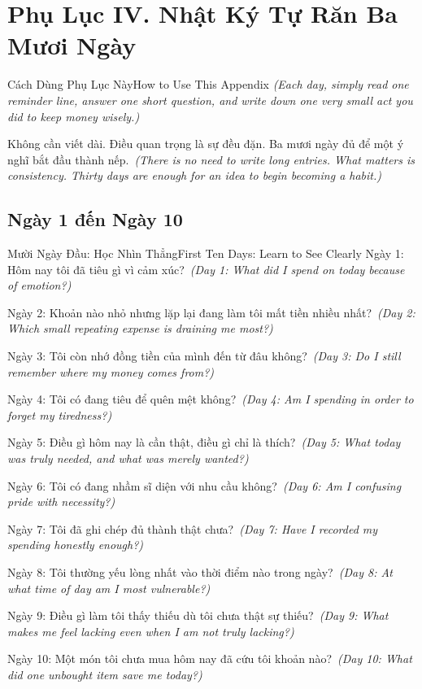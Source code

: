 \chapter*{Phụ Lục IV. Nhật Ký Tự Răn Ba Mươi Ngày}

\begin{truyen}{Cách Dùng Phụ Lục Này}{How to Use This Appendix}
\textit{(Each day, simply read one reminder line, answer one short question, and write down one very small act you did to keep money wisely.)}

Không cần viết dài. Điều quan trọng là sự đều đặn. Ba mươi ngày đủ để một ý nghĩ bắt đầu thành nếp.\
\textit{(There is no need to write long entries. What matters is consistency. Thirty days are enough for an idea to begin becoming a habit.)}
\end{truyen}

\section*{Ngày 1 đến Ngày 10}
\begin{truyen}{Mười Ngày Đầu: Học Nhìn Thẳng}{First Ten Days: Learn to See Clearly}
Ngày 1: Hôm nay tôi đã tiêu gì vì cảm xúc?\
\textit{(Day 1: What did I spend on today because of emotion?)}

Ngày 2: Khoản nào nhỏ nhưng lặp lại đang làm tôi mất tiền nhiều nhất?\
\textit{(Day 2: Which small repeating expense is draining me most?)}

Ngày 3: Tôi còn nhớ đồng tiền của mình đến từ đâu không?\
\textit{(Day 3: Do I still remember where my money comes from?)}

Ngày 4: Tôi có đang tiêu để quên mệt không?\
\textit{(Day 4: Am I spending in order to forget my tiredness?)}

Ngày 5: Điều gì hôm nay là cần thật, điều gì chỉ là thích?\
\textit{(Day 5: What today was truly needed, and what was merely wanted?)}

Ngày 6: Tôi có đang nhầm sĩ diện với nhu cầu không?\
\textit{(Day 6: Am I confusing pride with necessity?)}

Ngày 7: Tôi đã ghi chép đủ thành thật chưa?\
\textit{(Day 7: Have I recorded my spending honestly enough?)}

Ngày 8: Tôi thường yếu lòng nhất vào thời điểm nào trong ngày?\
\textit{(Day 8: At what time of day am I most vulnerable?)}

Ngày 9: Điều gì làm tôi thấy thiếu dù tôi chưa thật sự thiếu?\
\textit{(Day 9: What makes me feel lacking even when I am not truly lacking?)}

Ngày 10: Một món tôi chưa mua hôm nay đã cứu tôi khoản nào?\
\textit{(Day 10: What did one unbought item save me today?)}
\end{truyen}

